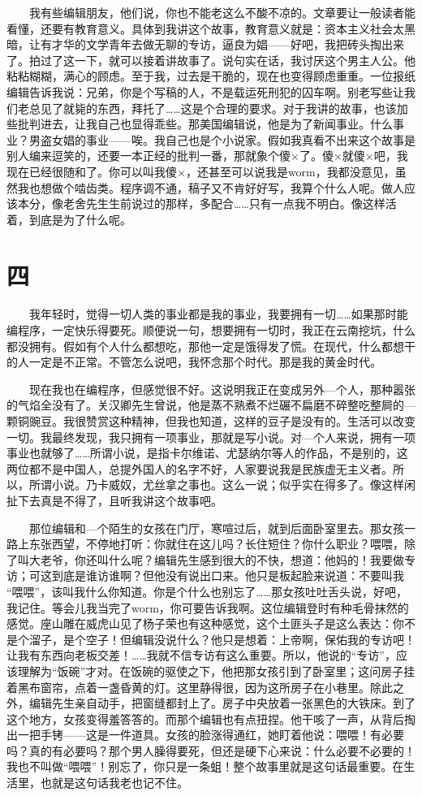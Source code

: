 　　我有些编辑朋友，他们说，你也不能老这么不酸不凉的。文章要让一般读者能看懂，还要有教育意义。具体到我讲这个故事，教育意义就是：资本主义社会太黑暗，让有才华的文学青年去做无聊的专访，逼良为娼——好吧，我把砖头掏出来了。拍过了这一下，就可以接着讲故事了。说句实在话，我讨厌这个男主人公。他粘粘糊糊，满心的顾虑。至于我，过去是干脆的，现在也变得顾虑重重。一位报纸编辑告诉我说：兄弟，你是个写稿的人，不是载运死刑犯的囚车啊。别老写些让我们老总见了就毙的东西，拜托了……这是个合理的要求。对于我讲的故事，也该加些批判进去，让我自己也显得乖些。那美国编辑说，他是为了新闻事业。什么事业？男盗女娼的事业——唉。我自己也是个小说家。假如我真看不出来这个故事是别人编来逗笑的，还要一本正经的批判一番，那就象个傻×了。傻×就傻×吧，我现在已经很随和了。你可以叫我傻×，还甚至可以说我是worm，我都没意见，虽然我也想做个啮齿类。程序调不通，稿子又不肯好好写，我算个什么人呢。做人应该本分，像老舍先生生前说过的那样，多配合……只有一点我不明白。像这样活着，到底是为了什么呢。 

\section{四} 

　　我年轻时，觉得一切人类的事业都是我的事业，我要拥有一切……如果那时能编程序，一定快乐得要死。顺便说一句，想要拥有一切时，我正在云南挖坑，什么都没拥有。假如有个人什么都想吃，那他一定是饿得发了慌。在现代，什么都想干的人一定是不正常。不管怎么说吧，我怀念那个时代。那是我的黄金时代。 

　　现在我也在编程序，但感觉很不好。这说明我正在变成另外—个人，那种嚣张的气焰全没有了。关汉卿先生曾说，他是蒸不熟煮不烂碾不扁磨不碎整吃整屙的— 颗铜豌豆。我很赞赏这种精神，但我也知道，这样的豆子是没有的。生活可以改变一切。我最终发现，我只拥有一项事业，那就是写小说。对—个人来说，拥有一项事业也就够了……所谓小说，是指卡尔维诺、尤瑟纳尔等人的作品，不是别的，这两位都不是中国人，总提外国人的名字不好，人家要说我是民族虚无主义者。所以，所谓小说。乃卡威奴，尤丝拿之事也。这么一说；似乎实在得多了。像这样闲扯下去真是不得了，且听我讲这个故事吧。 

　　那位编辑和—个陌生的女孩在门厅，寒喧过后，就到后面卧室里去。那女孩一路上东张西望，不停地打听：你就住在这儿吗？长住短住？你什么职业？喂喂，除了叫大老爷，你还叫什么呢？编辑先生感到很大的不快，想道：他妈的！我要做专访；可这到底是谁访谁啊？但他没有说出口来。他只是板起脸来说道：不要叫我 “喂喂”，该叫我什么你知道。你是个什么也别忘了……那女孩吐吐舌头说，好吧，我记住。等会儿我当完了worm，你可要告诉我啊。这位编辑登时有种毛骨抹然的感觉。座山雕在威虎山见了杨子荣也有这种感觉，这个土匪头子是这么表达：你不是个溜子，是个空子！但编辑没说什么？他只是想着：上帝啊，保佑我的专访吧！让我有东西向老板交差！……我就不信专访有这么重要。所以，他说的“专访”，应该理解为“饭碗”才对。在饭碗的驱使之下，他把那女孩引到了卧室里；这问房子挂着黑布窗帘，点着一盏昏黄的灯。这里静得很，因为这所房子在小巷里。除此之外，编辑先生亲自动手，把窗缝都封上了。房子中央放着一张黑色的大铁床。到了这个地方，女孩变得羞答答的。而那个编辑也有点扭捏。他干咳了一声，从背后掏出一把手铐——这是一件道具。女孩的脸涨得通红，她盯着他说：喂喂！有必要吗？真的有必要吗？那个男人臊得要死，但还是硬下心来说：什么必要不必要的！我也不叫做“喂喂”！别忘了，你只是一条蛆！整个故事里就是这句话最重要。在生活里，也就是这句话我老也记不住。 

